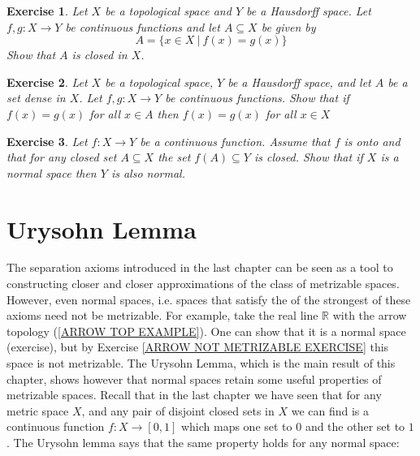 \documentclass[11pt, letterpaper, oneside]{report}
\renewcommand{\chaptermark}[1]{\markboth{#1}{}}
\theoremstyle{pplain}
\newtheorem{ITERMVALUE THM}[theorem]{Intermediate Value Theorem}
\newtheorem{HEINEBOREL THM}[theorem]{Heine-Borel Theorem}
\newtheorem{UMETR THM}[theorem]{Urysohn Metrization Theorem}
\newtheorem{UMETR2 THM}[theorem]{Urysohn Metrization Theorem (v.2)}
\theoremstyle{ddefinition}
\theoremstyle{nnn}
\newtheorem{TDA NN}[theorem]{Topological Data Analysis. }
\theoremstyle{eexercise}
\newtheorem{exercise}{Exercise}[chapter]
\newcommand{\R}{{\mathbb R}}
\begin{document}
\begin{exercise}
Let $X$ be a topological space and $Y$ be a Hausdorff space. 
Let $f, g\colon X\to Y$ be  continuous functions and let $A\subseteq X$ be given by  
$$A = \{ x\in X \ | \ f(x) = g(x)\}$$
Show that $A$ is closed in $X$. 
\end{exercise}



\begin{exercise}
\label{DENSE FUNCTIONS EQ EXERCISE}
Let $X$ be a topological space, $Y$ be a Hausdorff space, and let $A$ be a set dense in $X$. 
Let $f, g\colon X \to Y$ be continuous functions. Show that if $f(x) = g(x)$ for all $x\in A$ then 
$f(x) = g(x)$ for all $x\in X$
\end{exercise}





\begin{exercise}
Let $f\colon X\to Y$ be a continuous function. Assume that $f$ is onto and that 
for any closed set $A\subseteq X$ the set $f(A)\subseteq Y$ is closed. Show that if 
$X$ is a normal space then $Y$ is also normal.  
\end{exercise}









\newpage

\chapter{Urysohn Lemma}
\chaptermark{Urysohn Lemma}

\thispagestyle{firststyle}

The separation axioms introduced in the last chapter can be seen as a  tool to constructing 
closer and closer approximations of the class of metrizable spaces. However, even normal spaces, 
i.e. spaces  that satisfy the of the strongest of these axioms need not be metrizable.
For example, take the real line $\R$ with the arrow topology (\ref{ARROW TOP EXAMPLE}). 
One can show that it is a normal space (exercise), but by Exercise \ref{ARROW NOT METRIZABLE EXERCISE} 
this space is not metrizable. The Urysohn Lemma, which is the main result of this chapter, shows however 
that normal spaces retain some useful properties of metrizable spaces. Recall that in the last chapter we have 
seen that for any metric space $X$, and any pair of disjoint closed sets in $X$ we can find is a continuous function 
$f\colon X \to [0,1]$ which maps one set to $0$ and the other set to $1$. The Urysohn lemma says that  the same property holds for any normal space:   
\end{document}
